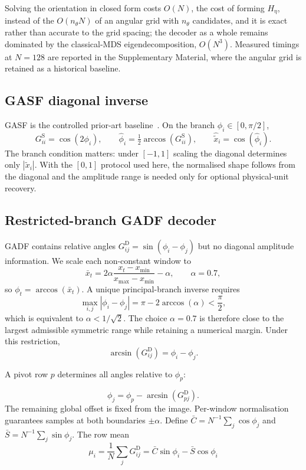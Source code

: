 \documentclass[preprint,12pt]{elsarticle}
\begin{document}
Solving the orientation in closed form costs \(O(N)\), the cost of forming \(H_\eta\), instead of the \(O(n_\theta N)\) of an angular grid with \(n_\theta\) candidates, and it is exact rather than accurate to the grid spacing; the decoder as a whole remains dominated by the classical-MDS eigendecomposition, \(O(N^3)\). Measured timings at \(N=128\) are reported in the Supplementary Material, where the angular grid is retained as a historical baseline.

\subsection{GASF diagonal inverse}\label{sec:gasf_reconstruction_method}

GASF is the controlled prior-art baseline~\cite{wang2015encoding}. On the branch \(\phi_i\in[0,\pi/2]\),
\[
G^{\mathrm S}_{ii}=\cos(2\phi_i),\qquad
\hat\phi_i=\tfrac12\arccos(G^{\mathrm S}_{ii}),\qquad
\hat{\tilde x}_i=\cos(\hat\phi_i).
\]
The branch condition matters: under \([-1,1]\) scaling the diagonal determines only \(|\tilde x_i|\). With the \([0,1]\) protocol used here, the normalised shape follows from the diagonal and the amplitude range is needed only for optional physical-unit recovery.

\subsection{Restricted-branch GADF decoder}\label{sec:gadf_reconstruction_proposal}

GADF contains relative angles \(G^{\mathrm D}_{ij}=\sin(\phi_i-\phi_j)\) but no diagonal amplitude information. We scale each non-constant window to
\[
\bar x_t=2\alpha\frac{x_t-x_{\min}}{x_{\max}-x_{\min}}-\alpha,
\qquad \alpha=0.7,
\]
so \(\phi_t=\arccos(\bar x_t)\). A unique principal-branch inverse requires
\[
\max_{i,j}|\phi_i-\phi_j|
=\pi-2\arccos(\alpha)<\frac{\pi}{2},
\]
which is equivalent to \(\alpha<1/\sqrt2\). The choice \(\alpha=0.7\) is therefore close to the largest admissible symmetric range while retaining a numerical margin. Under this restriction,
\[
\arcsin(G^{\mathrm D}_{ij})=\phi_i-\phi_j.
\]

A pivot row \(p\) determines all angles relative to \(\phi_p\):

\[
\phi_j=\phi_p-\arcsin(G^{\mathrm D}_{pj}).
\]
The remaining global offset is fixed from the image. Per-window normalisation guarantees samples at both boundaries \(\pm\alpha\). Define
\(\bar C=N^{-1}\sum_j\cos\phi_j\) and \(\bar S=N^{-1}\sum_j\sin\phi_j\). The row mean
\[
\mu_i=\frac1N\sum_j G^{\mathrm D}_{ij}
=\bar C\sin\phi_i-\bar S\cos\phi_i
\]
\end{document}
